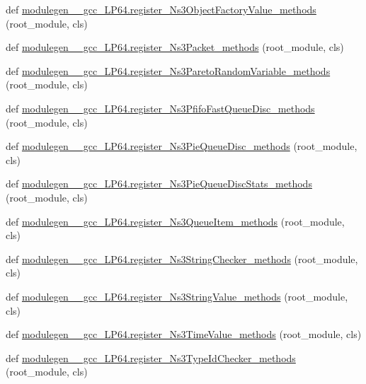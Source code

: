 \begin{DoxyCompactItemize}
\item 
def \hyperlink{namespacemodulegen____gcc__LP64_aa08b54c074e688b2a88a54ada11db8fc}{modulegen\+\_\+\+\_\+gcc\+\_\+\+L\+P64.\+register\+\_\+\+Ns3\+Object\+Factory\+Value\+\_\+methods} (root\+\_\+module, cls)
\item 
def \hyperlink{namespacemodulegen____gcc__LP64_a6784a1ccebf471415830ba331480b02c}{modulegen\+\_\+\+\_\+gcc\+\_\+\+L\+P64.\+register\+\_\+\+Ns3\+Packet\+\_\+methods} (root\+\_\+module, cls)
\item 
def \hyperlink{namespacemodulegen____gcc__LP64_aa21dc78e803a5556dfdef52ccbbd7b3c}{modulegen\+\_\+\+\_\+gcc\+\_\+\+L\+P64.\+register\+\_\+\+Ns3\+Pareto\+Random\+Variable\+\_\+methods} (root\+\_\+module, cls)
\item 
def \hyperlink{namespacemodulegen____gcc__LP64_a63a248280d0f7262c0841fa853269668}{modulegen\+\_\+\+\_\+gcc\+\_\+\+L\+P64.\+register\+\_\+\+Ns3\+Pfifo\+Fast\+Queue\+Disc\+\_\+methods} (root\+\_\+module, cls)
\item 
def \hyperlink{namespacemodulegen____gcc__LP64_aee1fb21e43b993111af311073d89c4e5}{modulegen\+\_\+\+\_\+gcc\+\_\+\+L\+P64.\+register\+\_\+\+Ns3\+Pie\+Queue\+Disc\+\_\+methods} (root\+\_\+module, cls)
\item 
def \hyperlink{namespacemodulegen____gcc__LP64_acf508b8065c733e393d27cb5121bcd71}{modulegen\+\_\+\+\_\+gcc\+\_\+\+L\+P64.\+register\+\_\+\+Ns3\+Pie\+Queue\+Disc\+Stats\+\_\+methods} (root\+\_\+module, cls)
\item 
def \hyperlink{namespacemodulegen____gcc__LP64_ae6b468b7c7e065242c616a4bf72ed204}{modulegen\+\_\+\+\_\+gcc\+\_\+\+L\+P64.\+register\+\_\+\+Ns3\+Queue\+Item\+\_\+methods} (root\+\_\+module, cls)
\item 
def \hyperlink{namespacemodulegen____gcc__LP64_a57453261f599489629a673263e3d5674}{modulegen\+\_\+\+\_\+gcc\+\_\+\+L\+P64.\+register\+\_\+\+Ns3\+String\+Checker\+\_\+methods} (root\+\_\+module, cls)
\item 
def \hyperlink{namespacemodulegen____gcc__LP64_afc0cb099c383e2ad726f647b55ef6e4e}{modulegen\+\_\+\+\_\+gcc\+\_\+\+L\+P64.\+register\+\_\+\+Ns3\+String\+Value\+\_\+methods} (root\+\_\+module, cls)
\item 
def \hyperlink{namespacemodulegen____gcc__LP64_a074f52c8db74b3898d974bf33a0240f8}{modulegen\+\_\+\+\_\+gcc\+\_\+\+L\+P64.\+register\+\_\+\+Ns3\+Time\+Value\+\_\+methods} (root\+\_\+module, cls)
\item 
def \hyperlink{namespacemodulegen____gcc__LP64_aaf5d00575008532556e0df2d3b8d5bef}{modulegen\+\_\+\+\_\+gcc\+\_\+\+L\+P64.\+register\+\_\+\+Ns3\+Type\+Id\+Checker\+\_\+methods} (root\+\_\+module, cls)

\end{DoxyCompactItemize}
